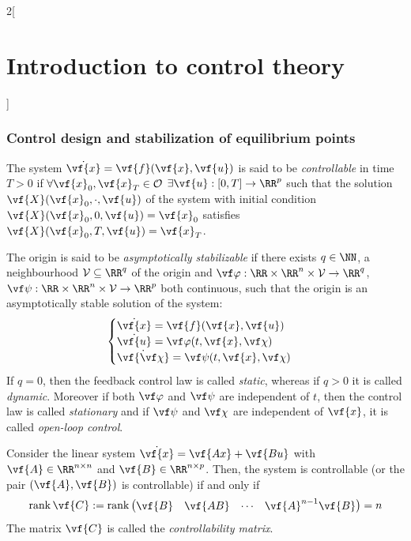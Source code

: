 \documentclass[../../../main_math.tex]{subfiles}
\begin{document}
\begin{multicols}{2}[\section{Introduction to control theory}]
  \subsubsection{Control design and stabilization of equilibrium points}
  \begin{definition}
    The system $\dot{\vf{x}} = \vf{f}(\vf{x}, \vf{u})$ is said to be \emph{controllable} in time $T>0$ if $\forall \vf{x}_0, \vf{x}_T\in \mathcal{O}$ $\exists \vf{u}: [0, T]\to \RR^p$ such that the solution $\vf{X}(\vf{x}_0,\cdot, \vf{u})$ of the system with initial condition $\vf{X}(\vf{x}_0, 0,\vf{u}) = \vf{x}_0$ satisfies $\vf{X}(\vf{x}_0, T,\vf{u}) = \vf{x}_T$.
  \end{definition}
  \begin{definition}
    The origin is said to be \emph{asymptotically stabilizable} if there exists $q\in \NN$, a neighbourhood $\mathcal{V}\subseteq \RR^q$ of the origin and $\vf\varphi:\RR\times\RR^n\times\mathcal{V}\to \RR^q$, $\vf\psi:\RR\times\RR^n\times\mathcal{V}\to \RR^p$ both continuous, such that the origin is an asymptotically stable solution of the system:
    \begin{equation}\label{ICT:augmented_system}
      \begin{cases}
        \dot{\vf{x}} = \vf{f}(\vf{x}, \vf{u})         \\
        \dot{\vf{u}} = \vf\varphi(t, \vf{x}, \vf\chi) \\
        \dot{\vf{\vf\chi}} = \vf\psi(t, \vf{x}, \vf\chi)
      \end{cases}
    \end{equation}
    If $q=0$, then the feedback control law is called \emph{static}, whereas if $q>0$ it is called \emph{dynamic}. Moreover if both $\vf\varphi$ and $\vf\psi$ are independent of $t$, then the control law is called \emph{stationary} and if $\vf\psi$ and $\vf\chi$ are independent of $\vf{x}$, it is called \emph{open-loop control}.
  \end{definition}
  \begin{theorem}
    Consider the linear system $\dot{\vf{x}} = \vf{Ax} + \vf{Bu}$ with $\vf{A}\in \RR^{n\times n}$ and $\vf{B}\in \RR^{n\times p}$. Then, the system is controllable (or the pair $(\vf{A},\vf{B})$ is controllable) if and only if
    $$
      \rank\vf{C}:=\rank\begin{pmatrix} \vf{B} & \vf{AB} & \cdots & \vf{A}^{n-1}\vf{B} \end{pmatrix} = n
    $$
    The matrix $\vf{C}$ is called the \emph{controllability matrix}.

\end{theorem}
\end{multicols}
\end{document}
